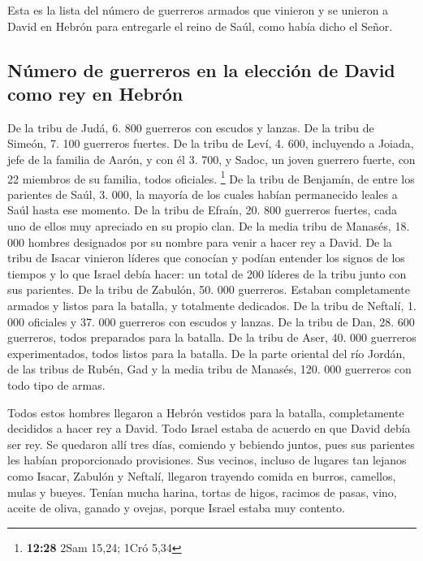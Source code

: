  Esta es la lista del número de guerreros armados que
vinieron y se unieron a David en Hebrón para entregarle el reino de
Saúl, como había dicho el Señor.

\hypertarget{nuxfamero-de-guerreros-en-la-elecciuxf3n-de-david-como-rey-en-hebruxf3n}{%
\subsection{Número de guerreros en la elección de David como rey en
Hebrón}\label{nuxfamero-de-guerreros-en-la-elecciuxf3n-de-david-como-rey-en-hebruxf3n}}

 De la tribu de Judá, 6. 800 guerreros con escudos y
lanzas.  De la tribu de Simeón, 7. 100 guerreros fuertes.
 De la tribu de Leví, 4. 600,  incluyendo
a Joiada, jefe de la familia de Aarón, y con él 3. 700, 
y Sadoc, un joven guerrero fuerte, con 22 miembros de su familia, todos
oficiales. \footnote{\textbf{12:28} 2Sam 15,24; 1Cró 5,34}
 De la tribu de Benjamín, de entre los parientes de Saúl,
3. 000, la mayoría de los cuales habían permanecido leales a Saúl hasta
ese momento.  De la tribu de Efraín, 20. 800 guerreros
fuertes, cada uno de ellos muy apreciado en su propio clan.
 De la media tribu de Manasés, 18. 000 hombres designados
por su nombre para venir a hacer rey a David.  De la
tribu de Isacar vinieron líderes que conocían y podían entender los
signos de los tiempos y lo que Israel debía hacer: un total de 200
líderes de la tribu junto con sus parientes.  De la tribu
de Zabulón, 50. 000 guerreros. Estaban completamente armados y listos
para la batalla, y totalmente dedicados.  De la tribu de
Neftalí, 1. 000 oficiales y 37. 000 guerreros con escudos y lanzas.
 De la tribu de Dan, 28. 600 guerreros, todos preparados
para la batalla.  De la tribu de Aser, 40. 000 guerreros
experimentados, todos listos para la batalla.  De la
parte oriental del río Jordán, de las tribus de Rubén, Gad y la media
tribu de Manasés, 120. 000 guerreros con todo tipo de armas.

 Todos estos hombres llegaron a Hebrón vestidos para la
batalla, completamente decididos a hacer rey a David. Todo Israel estaba
de acuerdo en que David debía ser rey.  Se quedaron allí
tres días, comiendo y bebiendo juntos, pues sus parientes les habían
proporcionado provisiones.  Sus vecinos, incluso de
lugares tan lejanos como Isacar, Zabulón y Neftalí, llegaron trayendo
comida en burros, camellos, mulas y bueyes. Tenían mucha harina, tortas
de higos, racimos de pasas, vino, aceite de oliva, ganado y ovejas,
porque Israel estaba muy contento.


